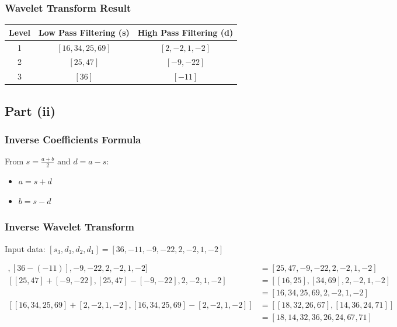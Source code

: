 \documentclass[12pt]{article}
\begin{document}
\subsubsection{Wavelet Transform Result}
\textbf{}
\begin{center}
\begin{tabular}{|c|c|c|}
\hline
\textbf{Level} & \textbf{Low Pass Filtering (s)} & \textbf{High Pass Filtering (d)} \\
\hline
1 & $[16, 34, 25, 69]$ & $[2, -2, 1, -2]$ \\
2 & $[25, 47]$ & $[-9, -22]$ \\
3 & $[36]$ & $[-11]$ \\
\hline
\end{tabular}
\end{center}

\subsection{Part (ii)}

\subsubsection{Inverse Coefficients Formula}

From $s = \frac{a + b}{2}$ and $d = a - s$:
\begin{itemize}
    \item $a = s + d$
    \item $b = s - d$
\end{itemize}

\subsubsection{Inverse Wavelet Transform}

Input data: $[s_3, d_3, d_2, d_1] = [36, -11, -9, -22, 2, -2, 1, -2]$ 

\begin{align*}
[[36+(-11)], [36-(-11)], -9, -22, 2, -2, 1, -2] &= [25, 47, -9, -22, 2, -2, 1, -2] \\
[[25, 47]+[-9, -22], [25, 47]-[-9, -22], 2, -2, 1, -2]
&= [[16, 25], [34, 69], 2, -2, 1, -2] \\
&= [16, 34, 25, 69, 2, -2, 1, -2] \\
[[16, 34, 25, 69]+[2, -2, 1, -2], [16, 34, 25, 69]-[2, -2, 1, -2]] 
&= [[18, 32, 26, 67], [14, 36, 24, 71]] \\
&= [18, 14, 32, 36, 26, 24, 67, 71]
\end{align*}
\end{document}
